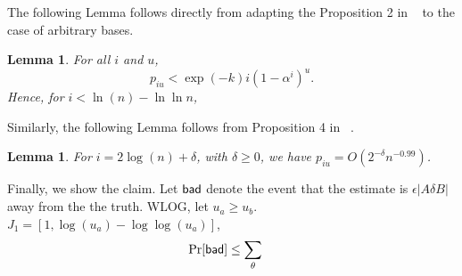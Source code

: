\documentclass{sig-alternate}
\newtheorem{lemma}[theorem]{Lemma}
\begin{document}
The following Lemma follows directly from adapting the Proposition 2 in ~\cite{} to the case of arbitrary bases. 
\begin{lemma}
	For all $i$ and $u$,
	$$p_{iu} < \exp(-k)i (1-\alpha^i)^u.$$
	Hence, for $ i < \ln(n) - \ln\ln n$, 
\end{lemma}

Similarly, the following Lemma follows from Proposition 4 in ~\cite{}.
\begin{lemma}
	For $i = 2\log(n) + \delta$, with $\delta\ge 0$, we have $p_{iu} = O(2^{-\delta}n^{-0.99})$. 
\end{lemma}

Finally, we show the claim. Let $\mathsf{bad}$ denote the event that the estimate is $\epsilon|A\delta B|$ away from the the truth. WLOG, let $u_a \ge u_b$. $J_1 = [1, \log(u_a) - \log\log(u_a)]$,
\begin{align*}
	\Pr[\mathsf{bad}] & \le \sum_{\theta} 
\end{align*}
 
\end{document}
